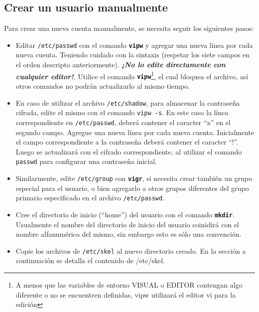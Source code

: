 \documentclass[12pt]{article}
\begin{document}
\subsection*{Crear un usuario manualmente}

Para crear una nueva cuenta manualmente, se necesita seguir los siguientes pasos:

\begin{itemize}
	
	\item  Editar \texttt{/etc/passwd} con el comando 
	\texttt{\textbf{vipw}} y agregar una nueva línea por cada nueva cuenta.
	Teniendo cuidado con la sintaxis (respetar los siete campos en el orden 
	descripto anteriormente).  \textit{\bf ¡No lo edite directamente
	con cualquier editor!}. Utilice el comando \texttt{\textbf{vipw}}\footnote{
	A menos que las variables de entorno VISUAL o EDITOR contengan algo diferente o 
	no se encuentren definidas, vipw utilizará el editor vi para la edición}, 
	el cual bloquea el archivo, así otros comandos no podrán actualizarlo al mismo tiempo. 

	\item En caso de utilizar el archivo \texttt{/etc/shadow}, para almacenar
	la contraseña cifrada, edite el mismo con el comando \texttt{vipw -s}. En este
	caso la línea correspondiente en \texttt{/etc/passwd}, deberá contener el caracter
	``x'' en el segundo campo. Agregue una nueva línea por cada nueva cuenta. Inicialmente
	el campo correspondiente a la contraseña deberá contener el caracter ``!''. Luego 
	se actualizará con el cifrado correspondiente, al utilizar el comando \texttt{passwd} para 
	configurar una contraseña inicial.  

	\item Similarmente, edite \texttt{/etc/group} con
	\texttt{\textbf{vigr}}, si necesita crear también un
	grupo especial para el usuario, o bien agregarlo a otros grupos
	diferentes del grupo primario especificado en el archivo \texttt{/etc/passwd}.  
        
	\item Cree el directorio de inicio (``home'') del
	usuario con el comando \texttt{\textbf{mkdir}}. Usualmente el nombre del directorio
	de inicio del usuario coinidirá con el nombre alfanumérico del mismo, sin embargo 
	esto es sólo una convención. 

	\item Copie los archivos de \texttt{/etc/skel} al nuevo directorio creado. 
	En la sección a continuación se detalla el contenido de /etc/skel. 


\end{itemize}
\end{document}
